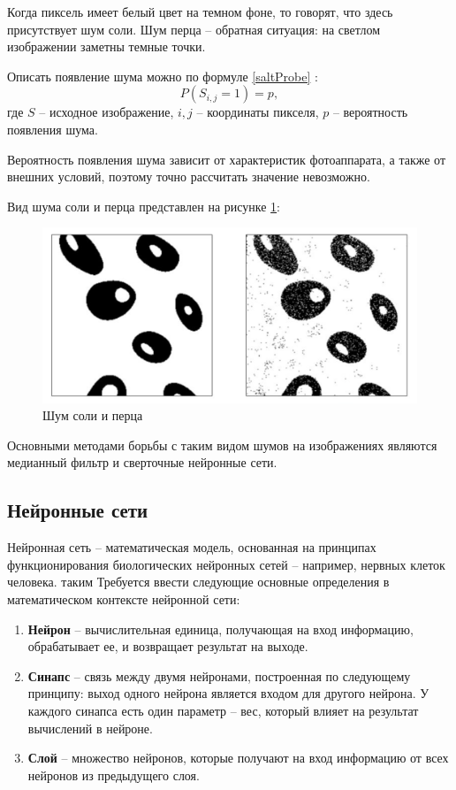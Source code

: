 Когда пиксель имеет белый цвет на темном фоне, то говорят, что здесь присутствует шум соли.
Шум перца -- обратная ситуация: на светлом изображении заметны темные точки.

Описать появление шума можно по формуле \eqref{saltProbe} \cite{moments}: 
\begin{equation}
	\label{saltProbe}
	P(S_{i, j} = 1) = p,
\end{equation}
где $S$ -- исходное изображение, $i, j$ -- координаты пикселя, $p$ -- вероятность появления шума. 

Вероятность появления шума зависит от характеристик фотоаппарата, а также от внешних условий, поэтому точно рассчитать значение невозможно.

\newpage
Вид шума соли и перца представлен на рисунке \ref{fig::salt}:
\FloatBarrier
\begin{figure}[h]	
	\begin{center}
		\includegraphics[width=\linewidth]{inc/png/salt.png}
	\end{center}
	\captionsetup{justification=centering}
	\caption{Шум соли и перца}
	\label{fig::salt}
\end{figure}
\FloatBarrier

Основными методами борьбы с таким видом шумов на изображениях являются медианный фильтр и сверточные нейронные сети.

\subsection{Нейронные сети}
Нейронная сеть -- математическая модель, основанная на принципах функционирования биологических нейронных сетей -- например, нервных клеток человека.
таким
Требуется ввести следующие основные определения в математическом контексте нейронной сети:
\begin{enumerate}
	\item \textbf{Нейрон} -- вычислительная единица, получающая на вход информацию, обрабатывает ее, и возвращает результат на выходе.
	\item \textbf{Синапс} -- связь между двумя нейронами, построенная по следующему принципу: выход одного нейрона является входом для другого нейрона. 
	У каждого синапса есть один параметр -- вес, который влияет на результат вычислений в нейроне.
	\item \textbf{Слой} -- множество нейронов, которые получают на вход информацию от всех нейронов из предыдущего слоя.
\end{enumerate}

